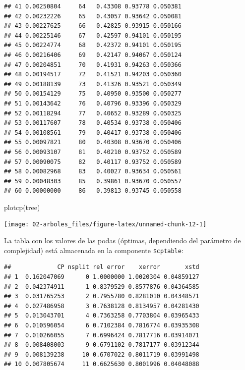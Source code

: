 \documentclass[
]{book}
\newenvironment{Shaded}{\begin{snugshade}}{\end{snugshade}}
\newcommand{\DecValTok}[1]{\textcolor[rgb]{0.00,0.00,0.81}{#1}}
\newcommand{\FunctionTok}[1]{\textcolor[rgb]{0.00,0.00,0.00}{#1}}
\newcommand{\NormalTok}[1]{#1}
\newcommand{\SpecialCharTok}[1]{\textcolor[rgb]{0.00,0.00,0.00}{#1}}
\theoremstyle{break}
\theoremstyle{definition}
\theoremstyle{definition}
\theoremstyle{definition}
\theoremstyle{definition}
\theoremstyle{remark}
\begin{document}
\begin{verbatim}
## 41 0.00250804     64   0.43308 0.93778 0.050381
## 42 0.00232226     65   0.43057 0.93642 0.050081
## 43 0.00227625     66   0.42825 0.93915 0.050166
## 44 0.00225146     67   0.42597 0.94101 0.050195
## 45 0.00224774     68   0.42372 0.94101 0.050195
## 46 0.00216406     69   0.42147 0.94067 0.050124
## 47 0.00204851     70   0.41931 0.94263 0.050366
## 48 0.00194517     72   0.41521 0.94203 0.050360
## 49 0.00188139     73   0.41326 0.93521 0.050349
## 50 0.00154129     75   0.40950 0.93500 0.050277
## 51 0.00143642     76   0.40796 0.93396 0.050329
## 52 0.00118294     77   0.40652 0.93289 0.050325
## 53 0.00117607     78   0.40534 0.93738 0.050406
## 54 0.00108561     79   0.40417 0.93738 0.050406
## 55 0.00097821     80   0.40308 0.93670 0.050406
## 56 0.00093107     81   0.40210 0.93752 0.050589
## 57 0.00090075     82   0.40117 0.93752 0.050589
## 58 0.00082968     83   0.40027 0.93634 0.050561
## 59 0.00048303     85   0.39861 0.93670 0.050557
## 60 0.00000000     86   0.39813 0.93745 0.050558
\end{verbatim}

\begin{Shaded}
\begin{Highlighting}[]
\FunctionTok{plotcp}\NormalTok{(tree)}
\end{Highlighting}
\end{Shaded}

\begin{center}\texttt{[image: 02-arboles\_files/figure-latex/unnamed-chunk-12-1]} \end{center}

La tabla con los valores de las podas (óptimas, dependiendo del parámetro de complejidad)
está almacenada en la componente \texttt{\$cptable}:

\begin{Shaded}
\end{Shaded}

\begin{verbatim}
##             CP nsplit rel error    xerror       xstd
## 1  0.162047069      0 1.0000000 1.0020304 0.04859127
## 2  0.042374911      1 0.8379529 0.8577876 0.04364585
## 3  0.031765253      2 0.7955780 0.8281010 0.04348571
## 4  0.027486958      3 0.7638128 0.8134957 0.04281430
## 5  0.013043701      4 0.7363258 0.7703804 0.03965433
## 6  0.010596054      6 0.7102384 0.7816774 0.03935308
## 7  0.010266055      7 0.6996424 0.7817716 0.03914071
## 8  0.008408003      9 0.6791102 0.7817177 0.03912344
## 9  0.008139238     10 0.6707022 0.8011719 0.03991498
## 10 0.007805674     11 0.6625630 0.8001996 0.04048088
\end{verbatim}
\end{document}
